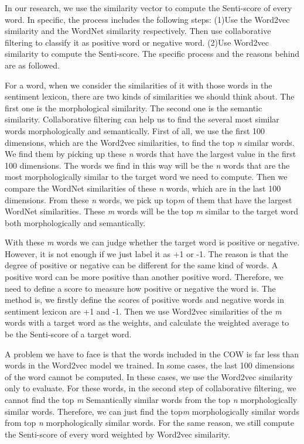 \documentclass[10pt, conference, compsocconf]{IEEEtran}
\begin{document}
In our research, we use the similarity vector to compute the Senti-score of every word. In specific, the process includes the following steps: (1)Use the Word2vec similarity and the WordNet similarity respectively. Then use collaborative filtering to classify it as positive word or negative word. (2)Use Word2vec similarity to compute the Senti-score. The specific process and the reasons behind are as followed.

For a word, when we consider the similarities of it with those words in the sentiment lexicon, there are two kinds of similarities we should think about. The first one is the morphological similarity. The second one is the semantic similarity. Collaborative filtering can help us to find the several most similar words morphologically and semantically. First of all, we use the first 100 dimensions, which are the Word2vec similarities, to find the top \textit{n} similar words. We find them by picking up these \textit{n} words that have the largest value in the first 100 dimensions. The words we find in this way will be the \textit{n} words that are the most morphologically similar to the target word we need to compute. Then we compare the WordNet similarities of these \textit{n} words, which are in the last 100 dimensions. From these \textit{n} words, we pick up top\textit{m} of them that have the largest WordNet similarities. These \textit{m} words will be the top \textit{m} similar to the target word both morphologically and semantically.

With these \textit{m} words we can judge whether the target word is positive or negative. However, it is not enough if we just label it as +1 or -1. The reason is that the degree of positive or negative can be different for the same kind of words. A positive word can be more positive than another positive word. Therefore, we need to define a score to measure how positive or negative the word is. The method is, we firstly define the scores of positive words and negative words in sentiment lexicon are +1 and -1. Then we use Word2vec similarities of the \textit{m} words with a target word as the weights, and calculate the weighted average to be the Senti-score of a target word.

A problem we have to face is that the words included in the COW is far less than words in the Word2vec model we trained. In some cases, the last 100 dimensions of the word cannot be computed. In these cases, we use the Word2vec similarity only to evaluate. For these words, in the second step of collaborative filtering, we cannot find the top \textit{m} Semantically similar words from the top \textit{n} morphologically similar words. Therefore, we can just find the top\textit{m} morphologically similar words from top \textit{n} morphologically similar words. For the same reason, we still compute the Senti-score of every word weighted by Word2vec similarity.
\end{document}
